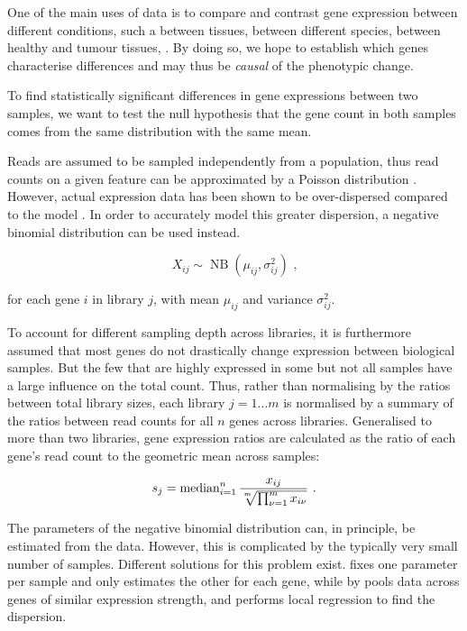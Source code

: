 One of the main uses of \rnaseq data is to compare and contrast gene expression
between different conditions, such a between tissues, between different species,
between healthy and tumour tissues, \etc. By doing so, we hope to establish
which genes characterise differences and may thus be \emph{causal} of the
phenotypic change.

To find statistically significant differences in gene expressions between two
samples, we want to test the null hypothesis that the gene count in both samples
comes from the same distribution with the same mean.

Reads are assumed to be sampled independently from a population, thus read
counts on a given feature can be approximated by a Poisson distribution
\citep{Mortazavi:2008, Marioni:2008}. However, actual expression data has been
shown to be over-dispersed compared to the model \citep{Robinson:2007}. In order
to accurately model this greater dispersion, a negative binomial distribution
can be used instead.

\begin{equation}
    X_{ij} \sim \operatorname{NB}(\mu_{ij}, \sigma^2_{ij}) \text{\ ,}
\end{equation}

for each gene \(i\) in library \(j\), with mean \(\mu_{ij}\) and variance
\(\sigma^2_{ij}\).

To account for different sampling depth across libraries, it is furthermore
assumed that most genes do not drastically change expression between biological
samples. But the few that are highly expressed in some but not all samples have
a large influence on the total count. Thus, rather than normalising by the
ratios between total library sizes, each library \(j = 1 \dots m\) is normalised
by a summary of the ratios between read counts for all \(n\) genes across
libraries. Generalised to more than two libraries, gene expression ratios are
calculated as the ratio of each gene’s read count to the geometric mean across
samples:

\begin{equation}
    s_j = \operatorname{median}_{i = 1}^n
        \frac{x_{ij}}{\sqrt[\uproot{2}m]{\prod_{\nu = 1}^m x_{i\nu}}}
        \text{\ .}
\end{equation}

The parameters of the negative binomial distribution can, in principle, be
estimated from the data. However, this is complicated by the typically very
small number of samples. Different solutions for this problem exist.
 \citep{Robinson:2010} fixes one parameter per sample and only
estimates the other for each gene, while  by \citet{Anders:2010}
pools data across genes of similar expression strength, and performs local
regression to find the dispersion.
